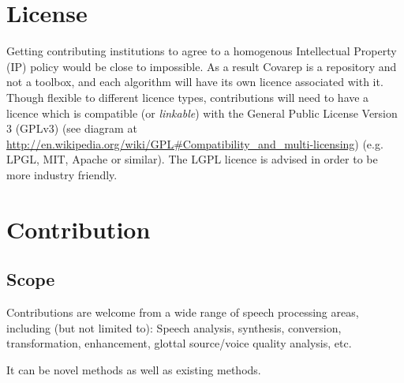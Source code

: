 \documentclass{article}
\begin{document}
\newpage

\section{License}
    Getting contributing institutions to agree to a homogenous Intellectual Property (IP) policy would be close to impossible. As a result Covarep is a repository and not a toolbox, and each algorithm will have its own licence associated with it. Though flexible to different licence types, contributions will need to have a licence which is compatible (or \textit{linkable}) with the General Public License Version 3 (GPLv3)
    (see diagram at \url{http://en.wikipedia.org/wiki/GPL#Compatibility\_and_multi-licensing}) (e.g. LPGL, MIT, Apache or similar).
    The LGPL licence is advised in order to be more industry friendly.


\section{Contribution}
    \subsection{Scope}
    Contributions are welcome from a wide range of speech processing areas, including (but not limited to): Speech analysis, synthesis, conversion, transformation, enhancement, glottal source/voice quality analysis, etc.

    It can be novel methods as well as existing methods.
\end{document}
